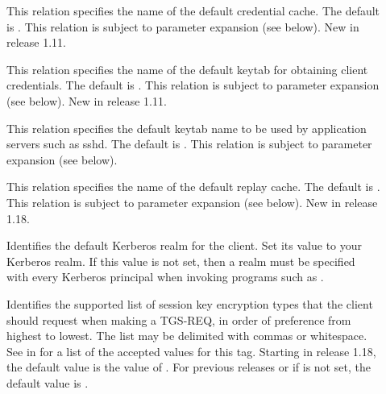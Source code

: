 \documentclass[letterpaper,10pt,english]{sphinxmanual}
\begin{document}
\begin{description}
\item[{}] \leavevmode
This relation specifies the name of the default credential cache.
The default is {\hyperref[\detokenize{mitK5defaults:paths}]{}}.  This relation is subject to parameter
expansion (see below).  New in release 1.11.

\item[{}] \leavevmode
This relation specifies the name of the default keytab for
obtaining client credentials.  The default is {\hyperref[\detokenize{mitK5defaults:paths}]{}}.  This
relation is subject to parameter expansion (see below).
New in release 1.11.

\item[{}] \leavevmode
This relation specifies the default keytab name to be used by
application servers such as sshd.  The default is {\hyperref[\detokenize{mitK5defaults:paths}]{}}.  This
relation is subject to parameter expansion (see below).

\item[{}] \leavevmode
This relation specifies the name of the default replay cache.
The default is .  This relation is subject to parameter
expansion (see below).  New in release 1.18.

\item[{}] \leavevmode
Identifies the default Kerberos realm for the client.  Set its
value to your Kerberos realm.  If this value is not set, then a
realm must be specified with every Kerberos principal when
invoking programs such as .

\item[{}] \leavevmode
Identifies the supported list of session key encryption types that
the client should request when making a TGS-REQ, in order of
preference from highest to lowest.  The list may be delimited with
commas or whitespace.  See {\hyperref[\detokenize{admin/conf_files/kdc_conf:encryption-types}]{}} in
{\hyperref[\detokenize{admin/conf_files/kdc_conf:kdc-conf-5}]{}} for a list of the accepted values for this tag.
Starting in release 1.18, the default value is the value of
.  For previous releases or if
 is not set, the default value is
.


\end{description}
\end{document}
